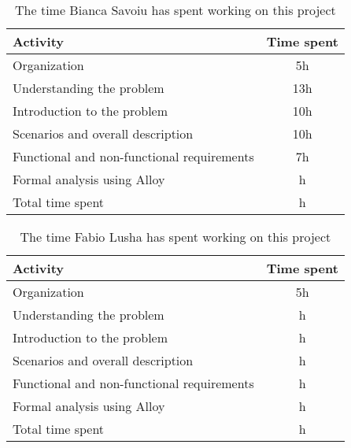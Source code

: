 \label{sec:Effort spent}%
\begin{table}[h!]
    \centering
    \begin{tabular}{|l|c|}
     \hline
     \textbf{Activity} & \textbf{Time spent} \\
    \hline
    Organization & 5h \\
    \hline
    Understanding the problem & 13h \\
    \hline
    Introduction to the problem & 10h \\
    \hline
    Scenarios and overall description & 10h \\
    \hline
    Functional and non-functional requirements & 7h \\
    \hline
    Formal analysis using Alloy & h \\
    \hline
    Total time spent & h \\
    \hline
\end{tabular}
    \caption{The time Bianca Savoiu has spent working on this project}
    \label{tab:Assumptions}
\end{table}


\begin{table}[h!]
    \centering
    \begin{tabular}{|l|c|}
    \hline
     \textbf{Activity} & \textbf{Time spent} \\
    \hline
    Organization & 5h \\
    \hline
    Understanding the problem & h \\
    \hline
    Introduction to the problem & h \\
    \hline
    Scenarios and overall description & h \\
    \hline
    Functional and non-functional requirements & h \\
    \hline
    Formal analysis using Alloy & h \\
    \hline
    Total time spent & h \\
    \hline
\end{tabular}
    \caption{The time Fabio Lusha has spent working on this project}
    \label{tab:Assumptions}
\end{table}